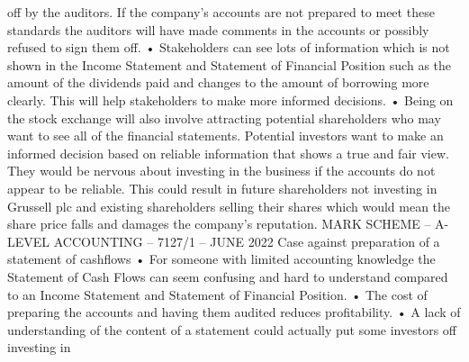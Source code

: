 \documentclass{article}
\begin{document}
off by the auditors.  If the company’s accounts are not prepared to meet these standards the auditors \newline
will have made comments in the accounts or possibly refused to sign them off. \newline
• Stakeholders can see lots of information which is not shown in the Income Statement and Statement \newline
of Financial Position such as the amount of the dividends paid and changes to the amount of \newline
borrowing more clearly.   This will help stakeholders to make more informed decisions. \newline
• Being on the stock exchange will also involve attracting potential shareholders who may want to see \newline
all of the financial statements. Potential investors want to make an informed decision based on reliable \newline
information that shows a true and fair view.  They would be nervous about investing in the business if \newline
the accounts do not appear to be reliable.  This could result in future shareholders not investing in \newline
Grussell plc and existing shareholders selling their shares which would mean the share price falls and \newline
damages the company’s reputation. \newline
 \newline
 \newline
 \newline
 \newline
 \newline
MARK SCHEME – A-LEVEL ACCOUNTING – 7127/1 – JUNE 2022  \newline
Case against preparation of a statement of cashflows \newline
 \newline
• For someone with limited accounting knowledge the Statement of Cash Flows can seem confusing \newline
and hard to understand compared to an Income Statement and Statement of Financial Position. \newline
• The cost of preparing the accounts and having them audited reduces profitability. \newline
• A lack of understanding of the content of a statement could actually put some investors off investing in \newline
\end{document}
